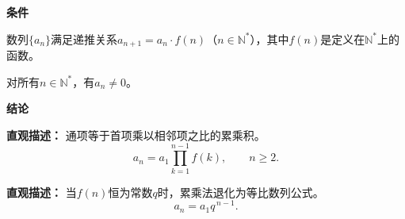 \begin{statementbox}
	\textbf{\textcolor{CStatement}{条件}}
	\begin{description}[style=nextline, leftmargin=2.8em, labelsep=0.5em, itemsep=0.35em]
		\item[\textbf{\textcolor{CStatement}{条件1（递推与定义）：}}] 数列$\{a_n\}$满足递推关系$a_{n+1}=a_n\cdot f(n)$（$n\in\mathbb{N}^*$），其中$f(n)$是定义在$\mathbb{N}^*$上的函数。
		\item[\textbf{\textcolor{CStatement}{条件2（非零条件）：}}] 对所有$n\in\mathbb{N}^*$，有$a_n\neq 0$。
	\end{description}

	\textbf{\textcolor{CStatement}{结论}}
	\begin{description}[style=nextline, leftmargin=2.8em, labelsep=0.5em, itemsep=0.45em]
		\item[\textbf{\textcolor{CStatement}{结论一（累乘公式）：}}]
			\textbf{\textcolor{CStatement}{直观描述：}}
			通项等于首项乘以相邻项之比的累乘积。
			\[
				a_n = a_1\prod_{k=1}^{n-1}f(k),
				\qquad
				n\geq 2.
			\]
		\item[\textbf{\textcolor{CStatement}{推广结论（特例等比）：}}]
			\textbf{\textcolor{CStatement}{直观描述：}}
			当$f(n)$恒为常数$q$时，累乘法退化为等比数列公式。
			\[
				a_n = a_1 q^{\,n-1}.
			\]
	\end{description}
\end{statementbox}
